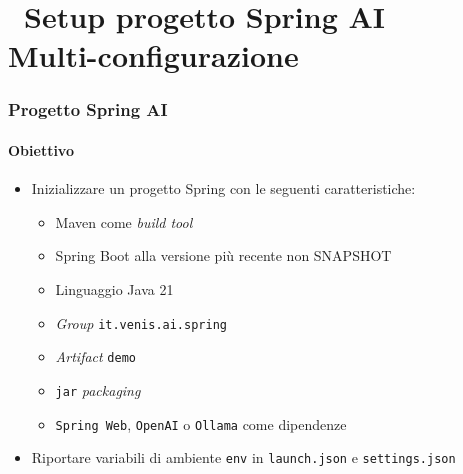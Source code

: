 \section{\faWrench\ Setup progetto Spring AI\\{\small Multi-configurazione}} %
\label{sec:spring-ai-project-setup}
%
\begin{frame}[t,fragile] \frametitle{Progetto Spring AI}
    \framesubtitle{Obiettivo}
    \begin{itemize}[leftmargin=10pt,align=right]
        \item[\alert{\faArrowCircleRight}] Inizializzare un progetto Spring con le seguenti caratteristiche:     
        \begin{itemize}[leftmargin=10pt,align=right]
            \item[\alert{\faArrowCircleRight}] \alert{Maven} come \textit{build tool}
            \item[\alert{\faArrowCircleRight}] Spring Boot alla versione più recente \alert{non SNAPSHOT}
            \item[\alert{\faArrowCircleRight}] Linguaggio \alert{Java 21}
            \item[\alert{\faArrowCircleRight}] \textit{Group} \alert{\texttt{it.venis.ai.spring}}
            \item[\alert{\faArrowCircleRight}] \textit{Artifact} \alert{\texttt{demo}}
            \item[\alert{\faArrowCircleRight}] \alert{\texttt{jar}} \textit{packaging}
            \item[\alert{\faArrowCircleRight}] \alert{\texttt{Spring Web}}, \alert{\texttt{OpenAI}} o \alert{\texttt{Ollama}} come dipendenze
        \end{itemize}
    \item[\alert{\faExclamationTriangle}] Riportare variabili di ambiente \texttt{env} in \texttt{launch.json} e \texttt{settings.json}
    \end{itemize}
\end{frame}
%
